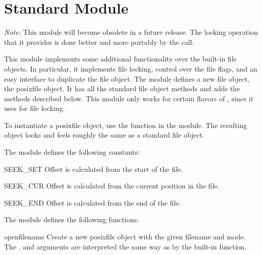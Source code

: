 \section{Standard Module }
\label{module-posixfile}

\emph{Note:} This module will become obsolete in a future release.
The locking operation that it provides is done better and more
portably by the  call.%

This module implements some additional functionality over the built-in
file objects.  In particular, it implements file locking, control over
the file flags, and an easy interface to duplicate the file object.
The module defines a new file object, the posixfile object.  It
has all the standard file object methods and adds the methods
described below.  This module only works for certain flavors of
\UNIX{}, since it uses  for file locking.%

To instantiate a posixfile object, use the  function
in the  module.  The resulting object looks and
feels roughly the same as a standard file object.

The  module defines the following constants:


\begin{datadesc}{SEEK_SET}
Offset is calculated from the start of the file.
\end{datadesc}

\begin{datadesc}{SEEK_CUR}
Offset is calculated from the current position in the file.
\end{datadesc}

\begin{datadesc}{SEEK_END}
Offset is calculated from the end of the file.
\end{datadesc}

The  module defines the following functions:


\begin{funcdesc}{open}{filename}
 Create a new posixfile object with the given filename and mode.  The
 ,  and  arguments are
 interpreted the same way as by the built-in 
 function.
\end{funcdesc}


